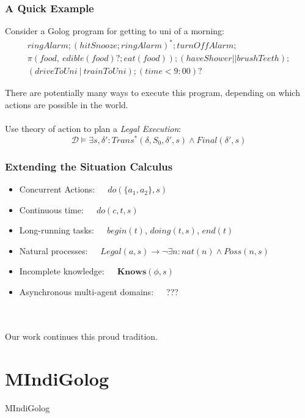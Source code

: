 \documentclass{beamer}
\newcommand{\Dt}{\mathcal{D}}
\newcommand{\Knows}{\mathbf{Knows}}
\begin{document}
\begin{frame}
\frametitle{A Quick Example}
Consider a Golog program for getting to uni of a morning:\[
\begin{array}{c}
ringAlarm;(hitSnooze; ringAlarm)^*;turnOffAlarm;\\
\pi(food,\ edible(food)?;eat(food)); (haveShower || brushTeeth);\\
(driveToUni\ |\ trainToUni); (time<9:00)?
\end{array}\]

There are potentially many ways to execute this program, depending on which 
actions are possible in the world.
\pause
\ \\
\ \\
Use theory of action to plan a \emph{Legal Execution}:\[
\Dt \models \exists s,\delta': Trans^{*}(\delta,S_0,\delta',s) \wedge Final(\delta',s)\]

\end{frame}

\begin{frame}
\frametitle{Extending the Situation Calculus}
\begin{itemize}
\pause
\item Concurrent Actions:\ \ \ $do(\{a_1,a_2\},s)$
\pause
\item Continuous time:\ \ \ $do(c,t,s)$
\pause
\item Long-running tasks:\ \ \ $begin(t)$, $doing(t,s)$, $end(t)$
\pause
\item Natural processes:\ \ \ $Legal(a,s)\rightarrow\neg\exists n: nat(n) \wedge Poss(n,s)$
\pause
\item Incomplete knowledge:\ \ \ $\Knows(\phi,s)$
\pause
\item Asynchronous multi-agent domains:\ \ \ ???
\end{itemize}
\ \\
\ \\
\pause
Our work continues this proud tradition.
\end{frame}

\section{MIndiGolog}

\begin{frame}
\centering \large MIndiGolog\\
\end{frame}
\end{document}

